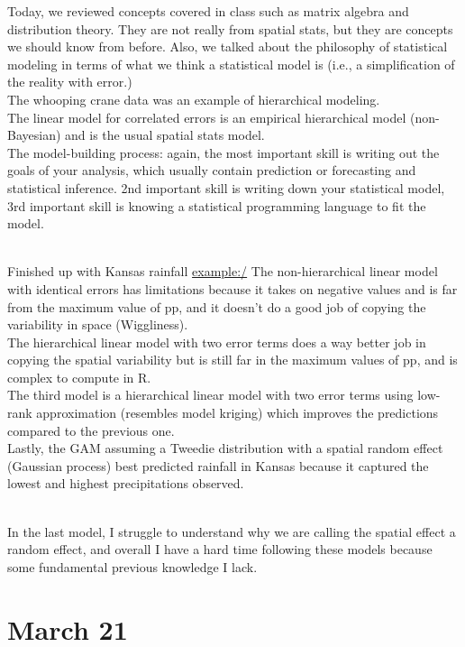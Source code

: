 \documentclass[
]{book}
\begin{document}
Today, we reviewed concepts covered in class such as matrix algebra and distribution theory. They are not really from spatial stats, but they are concepts we should know from before. Also, we talked about the philosophy of statistical modeling in terms of what we think a statistical model is (i.e., a simplification of the reality with error.)\\
The whooping crane data was an example of hierarchical modeling.\\
The linear model for correlated errors is an empirical hierarchical model (non-Bayesian) and is the usual spatial stats model.\\
The model-building process: again, the most important skill is writing out the goals of your analysis, which usually contain prediction or forecasting and statistical inference. 2nd important skill is writing down your statistical model, 3rd important skill is knowing a statistical programming language to fit the model.\\
\strut \\
Finished up with Kansas rainfall \url{example:/}
The non-hierarchical linear model with identical errors has limitations because it takes on negative values and is far from the maximum value of pp, and it doesn't do a good job of copying the variability in space (Wiggliness).\\
The hierarchical linear model with two error terms does a way better job in copying the spatial variability but is still far in the maximum values of pp, and is complex to compute in R.\\
The third model is a hierarchical linear model with two error terms using low-rank approximation (resembles model kriging) which improves the predictions compared to the previous one.\\
Lastly, the GAM assuming a Tweedie distribution with a spatial random effect (Gaussian process) best predicted rainfall in Kansas because it captured the lowest and highest precipitations observed.\\
\strut \\
In the last model, I struggle to understand why we are calling the spatial effect a random effect, and overall I have a hard time following these models because some fundamental previous knowledge I lack.

\hypertarget{march-21}{%
\section{March 21}\label{march-21}}
\end{document}
